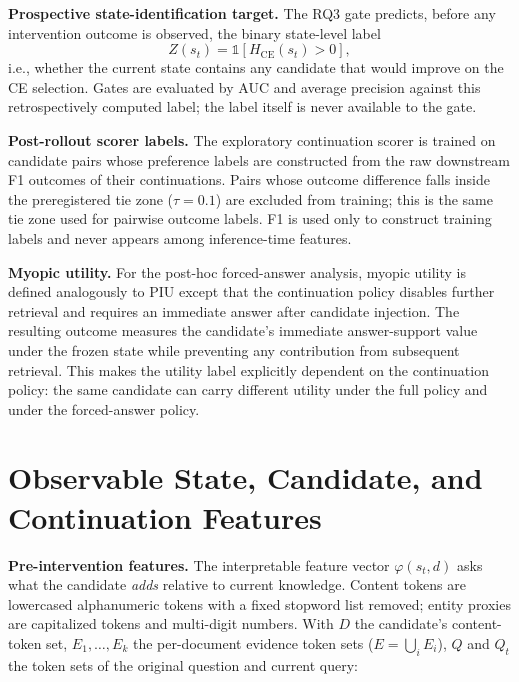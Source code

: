 \documentclass[10pt]{article}
\newcommand{\stitle}[1]{\vspace{0.4em}\noindent\textbf{#1}\hspace{0.6em}}
\begin{document}
\stitle{Prospective state-identification target.}
The RQ3 gate predicts, before any intervention outcome is observed, the
binary state-level label
\begin{equation}
Z(s_t) = \mathbb{1}[H_{\mathrm{CE}}(s_t) > 0],
\label{eq:zlabel}
\end{equation}
i.e., whether the current state contains any candidate that would improve on
the CE selection. Gates are evaluated by AUC and average precision against
this retrospectively computed label; the label itself is never available to
the gate.

\stitle{Post-rollout scorer labels.}
The exploratory continuation scorer is trained on candidate pairs whose
preference labels are constructed from the raw downstream F1 outcomes of
their continuations. Pairs whose outcome difference falls inside the
preregistered tie zone ($\tau=0.1$) are excluded from training; this is the
same tie zone used for pairwise outcome labels. F1 is used only to construct
training labels and never appears among inference-time features.

\stitle{Myopic utility.}
For the post-hoc forced-answer analysis, myopic utility is defined
analogously to PIU except that the continuation policy disables further
retrieval and requires an immediate answer after candidate injection. The
resulting outcome measures the candidate's immediate answer-support value
under the frozen state while preventing any contribution from subsequent
retrieval. This makes the utility label explicitly dependent on the
continuation policy: the same candidate can carry different utility under
the full policy and under the forced-answer policy.

\section{Observable State, Candidate, and Continuation Features}
\label{sec:features}

\stitle{Pre-intervention features.}
The interpretable feature vector $\varphi(s_t,d)$ asks what the candidate
\emph{adds} relative to current knowledge.
Content tokens are lowercased alphanumeric tokens with a fixed stopword list
removed; entity proxies are capitalized tokens and multi-digit numbers.
With $D$ the candidate's content-token set, $E_1,\dots,E_k$ the per-document
evidence token sets ($E=\bigcup_i E_i$), $Q$ and $Q_t$ the token sets of the
original question and current query:
\end{document}
